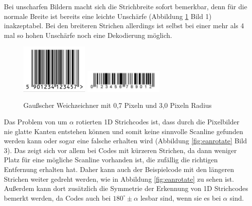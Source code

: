 Bei unscharfen Bildern macht sich die Strichbreite sofort bemerkbar, denn für die normale Breite ist bereits eine leichte Unschärfe (Abbildung \ref*{fig:eanblurry} Bild 1) inakzeptabel. Bei den breiteren Strichen allerdings ist selbst bei einer mehr als 4 mal so hohen Unschärfe noch eine Dekodierung möglich.
\begin{figure}[H]
  \centering
  \includegraphics[width=0.30\textwidth]{img/EAN13/blurry_01_07.jpg}
  \includegraphics[width=0.35\textwidth]{img/EAN13/blurry_02_3.jpg}
  \caption{Gaußscher Weichzeichner mit 0,7 Pixeln und 3,0 Pixeln Radius}
  \label{fig:eanblurry}
\end{figure}

Das Problem von um $\alpha$ rotierten 1D Strichcodes ist, dass durch die Pixelbilder nie glatte Kanten entstehen können und somit keine sinnvolle Scanline gefunden werden kann oder sogar eine falsche erhalten wird (Abbildung \ref*{fig:eanrotate} Bild 3). Das zeigt sich vor allem bei Codes mit kürzeren Strichen, da dann weniger Platz für eine mögliche Scanline vorhanden ist, die zufällig die richtigen Entfernung erhalten hat. Daher kann auch der Beispielcode mit den längeren Strichen weiter gedreht werden, wie in Abbildung \ref*{fig:eanrotate} zu sehen ist. Außerdem kann dort zusätzlich die Symmetrie der Erkennung von 1D Strichcodes bemerkt werden, da Codes auch bei $180^\circ \pm \alpha$ lesbar sind, wenn sie es bei $\alpha$ sind.

